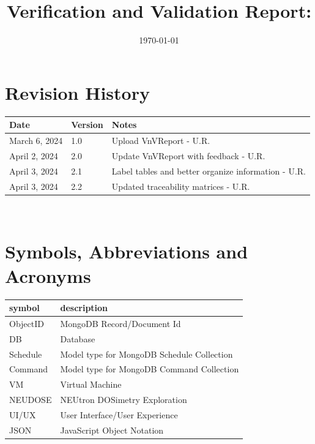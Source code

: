 \documentclass[12pt, titlepage]{article}
\begin{document}
\title{Verification and Validation Report: \progname} 
\author{\authname}
\date{\today}
	
\maketitle


\section{Revision History}

\begin{tabularx}{\textwidth}{p{3cm}p{2cm}X}
\toprule {\bf Date} & {\bf Version} & {\bf Notes}\\
\midrule
March 6, 2024 & 1.0 & Upload VnVReport - U.R.\\
April 2, 2024 & 2.0 & Update VnVReport with feedback - U.R.\\
April 3, 2024 & 2.1 & Label tables and better organize information - U.R.\\
April 3, 2024 & 2.2 & Updated traceability matrices - U.R.\\
\bottomrule
\end{tabularx}

~\newpage

\section{Symbols, Abbreviations and Acronyms}

\renewcommand{\arraystretch}{1.2}
\begin{tabular}{l l} 
  \toprule		
  \textbf{symbol} & \textbf{description}\\
  \midrule 
  ObjectID & MongoDB Record/Document Id\\
  DB & Database\\
  Schedule & Model type for MongoDB Schedule Collection \\
  Command & Model type for MongoDB Command Collection \\
  VM & Virtual Machine \\
  NEUDOSE & NEUtron DOSimetry Exploration \\
  UI/UX & User Interface/User Experience \\
  JSON & JavaScript Object Notation \\
  \bottomrule
\end{tabular}\\
\end{document}
